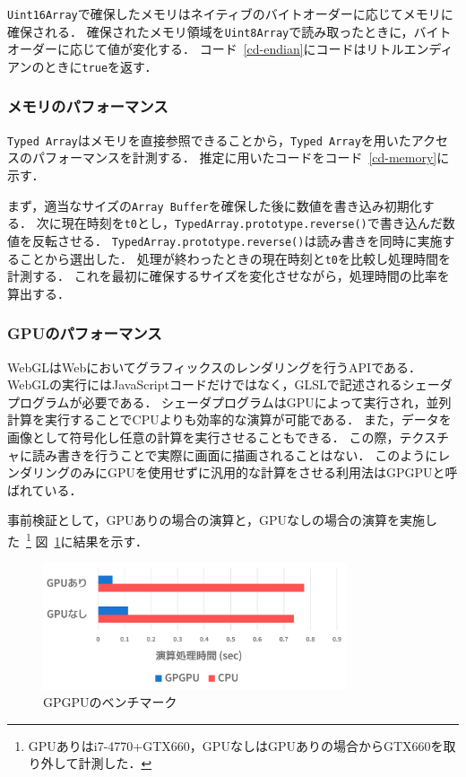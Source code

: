 \texttt{Uint16Array}で確保したメモリはネイティブのバイトオーダーに応じてメモリに確保される．
確保されたメモリ領域を\texttt{Uint8Array}で読み取ったときに，バイトオーダーに応じて値が変化する．
コード~\ref{cd-endian}にコードはリトルエンディアンのときに\texttt{true}を返す．

\subsubsection{メモリのパフォーマンス}
\texttt{Typed Array}はメモリを直接参照できることから，\texttt{Typed Array}を用いたアクセスのパフォーマンスを計測する．
推定に用いたコードをコード~\ref{cd-memory}に示す．



まず，適当なサイズの\texttt{Array Buffer}を確保した後に数値を書き込み初期化する．
次に現在時刻を\texttt{t0}とし，\texttt{TypedArray.prototype.reverse()}で書き込んだ数値を反転させる．
\texttt{TypedArray.prototype.reverse()}は読み書きを同時に実施することから選出した．
処理が終わったときの現在時刻と\texttt{t0}を比較し処理時間を計測する．
これを最初に確保するサイズを変化させながら，処理時間の比率を算出する．

\subsubsection{GPUのパフォーマンス}
WebGLはWebにおいてグラフィックスのレンダリングを行うAPIである．
WebGLの実行にはJavaScriptコードだけではなく，GLSLで記述されるシェーダプログラムが必要である．
シェーダプログラムはGPUによって実行され，並列計算を実行することでCPUよりも効率的な演算が可能である．
また，データを画像として符号化し任意の計算を実行させることもできる．
この際，テクスチャに読み書きを行うことで実際に画面に描画されることはない．
このようにレンダリングのみにGPUを使用せずに汎用的な計算をさせる利用法はGPGPUと呼ばれている．

事前検証として，GPUありの場合の演算と，GPUなしの場合の演算を実施した~\footnote{GPUありはi7-4770+GTX660，GPUなしはGPUありの場合からGTX660を取り外して計測した．}
図~\ref{fig-gpgpu}に結果を示す．

\begin{figure}[H]
	\centering
    \includegraphics[width=0.8\textwidth,pagebox=artbox]{fig/gpgpu.png}
    \caption{GPGPUのベンチマーク}
    \label{fig-gpgpu}
\end{figure}

